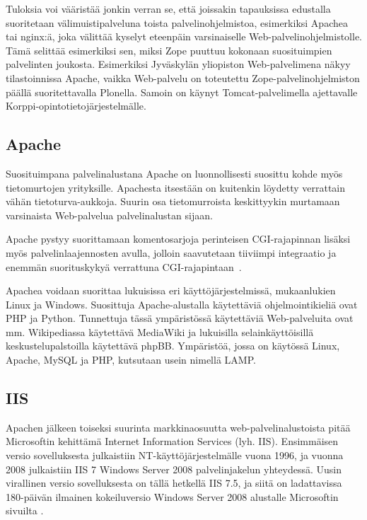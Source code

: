 Tuloksia voi vääristää jonkin verran se, että joissakin tapauksissa
edustalla suoritetaan välimuistipalveluna toista palvelinohjelmistoa,
esimerkiksi Apachea tai nginx:ä, joka välittää kyselyt eteenpäin
varsinaiselle Web-palvelinohjelmistolle. Tämä selittää esimerkiksi
sen, miksi Zope puuttuu kokonaan suosituimpien palvelinten
joukosta. Esimerkiksi Jyväskylän yliopiston Web-palvelimena näkyy
tilastoinnissa Apache, vaikka Web-palvelu on toteutettu
Zope-palvelinohjelmiston päällä suoritettavalla Plonella. Samoin on
käynyt Tomcat-palvelimella ajettavalle Korppi-o\-pin\-to\-tie\-to\-jär\-jes\-tel\-mäl\-le.

\subsection{Apache}

Suosituimpana palvelinalustana Apache on luonnollisesti suosittu kohde
myös tietomurtojen yrityksille. Apachesta itsestään on kuitenkin
löydetty verrattain vähän
tietoturva-aukkoja. Suurin osa tietomurroista
keskittyykin murtamaan varsinaista Web-palvelua palvelinalustan
sijaan.  %

Apache pystyy suorittamaan komentosarjoja perinteisen CGI-rajapinnan
lisäksi myös palvelinlaajennosten avulla, jolloin saavutetaan
tiiviimpi integraatio ja enemmän suorituskykyä verrattuna
CGI-rajapintaan~\cite{cginopeus}.

Apachea voidaan suorittaa lukuisissa eri käyttöjärjestelmissä,
mukaanlukien Linux ja Windows. Suosittuja Apache-alustalla
käytettäviä ohjelmointikieliä ovat PHP ja Python. Tunnettuja tässä
ympäristössä käytettäviä Web-palveluita ovat mm. Wikipediassa
käytettävä MediaWiki ja lukuisilla selainkäyttöisillä
keskustelupalstoilla käytettävä phpBB. Ympäristöä, jossa on käytössä
Linux, Apache, MySQL ja PHP, kutsutaan usein nimellä LAMP.

\subsection{IIS}

Apachen jälkeen toiseksi suurinta markkinaosuutta web-palvelinalustoista pitää Microsoftin kehittämä Internet Information Services (lyh. IIS). Ensimmäisen versio sovelluksesta
julkaistiin NT-käyttöjärjestelmälle vuona 1996, ja vuonna 2008 julkaistiin IIS 7 Windows Server 2008 palvelinjakelun yhteydessä. Uusin virallinen versio sovelluksesta on tällä hetkellä   
IIS 7.5, ja siitä on ladattavissa 180-päivän ilmainen kokeiluversio Windows Server 2008 alustalle Microsoftin sivuilta \cite{IIS}.

